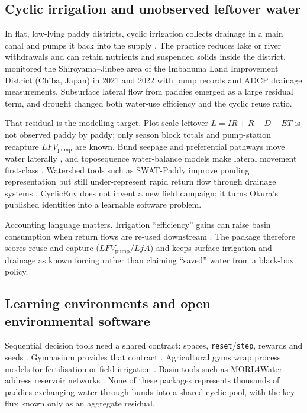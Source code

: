 \documentclass[preprint,12pt,authoryear,review]{elsarticle}
\begin{document}
\subsection{Cyclic irrigation and unobserved leftover water}

In flat, low-lying paddy districts, cyclic irrigation collects drainage in a main canal and pumps it back into the supply \citep{takeda1997,hama2010}. The practice reduces lake or river withdrawals and can retain nutrients and suspended solids inside the district. \citet{okura2025} monitored the Shiroyama--Jinbee area of the Imbanuma Land Improvement District (Chiba, Japan) in 2021 and 2022 with pump records and ADCP drainage measurements. Subsurface lateral flow from paddies emerged as a large residual term, and drought changed both water-use efficiency and the cyclic reuse ratio.

That residual is the modelling target. Plot-scale leftover $L = IR + R - D - ET$ is not observed paddy by paddy; only season block totals and pump-station recapture $LFV_{\mathrm{pump}}$ are known. Bund seepage and preferential pathways move water laterally \citep{walker1986,janssen2009}, and toposequence water-balance models make lateral movement first-class \citep{tsubo2007}. Watershed tools such as SWAT-Paddy improve ponding representation but still under-represent rapid return flow through drainage systems \citep{tsuchiya2018}. CyclicEnv does not invent a new field campaign; it turns Okura's published identities into a learnable software problem.

Accounting language matters. Irrigation ``efficiency'' gains can raise basin consumption when return flows are re-used downstream \citep{perry2007,grafton2018}. The package therefore scores reuse and capture ($LFV_{\mathrm{pump}}/LfA$) and keeps surface irrigation and drainage as known forcing rather than claiming ``saved'' water from a black-box policy.

\subsection{Learning environments and open environmental software}

Sequential decision tools need a shared contract: spaces, \texttt{reset}/\texttt{step}, rewards and seeds \citep{sutton2018}. Gymnasium provides that contract \citep{towers2024}. Agricultural gyms wrap process models for fertilisation or field irrigation \citep{overweg2021,gautron2022,kelly2021,kelly2024}. Basin tools such as MORL4Water address reservoir networks \citep{osika2026}. None of these packages represents thousands of paddies exchanging water through bunds into a shared cyclic pool, with the key flux known only as an aggregate residual.
\end{document}
